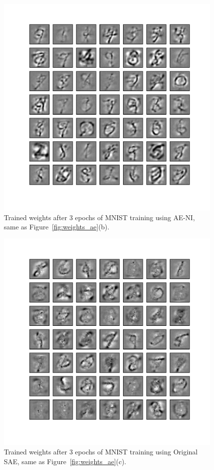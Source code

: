 \begin{figure}
	\centering
	\includegraphics[width=\textwidth]{pics_sdlm/23_MNIST_AE_noise/2_60000_0.pdf}
	\caption[Trained weights of AE-NI, same as Figure~\ref{fig:weights_ae}(b).]{Trained weights after 3 epochs of MNIST training using AE-NI, same as Figure~\ref{fig:weights_ae}(b).}
	\label{fig:weights_ae2}
\end{figure}

\begin{figure}
	\centering
	\includegraphics[width=\textwidth]{pics_sdlm/40_MNIST_SAE_original/2_60000_0.pdf}
	\caption[Trained weights of SAE, same as Figure~\ref{fig:weights_ae}(c).]{Trained weights after 3 epochs of MNIST training using Original SAE, same as Figure~\ref{fig:weights_ae}(c).}
	\label{fig:weights_ae3}
\end{figure}

